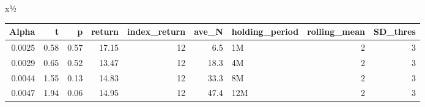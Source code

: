x½%
\begin{table}[ht]
\centering
\begin{tabular}{rrrrrrlrr}
  \hline
Alpha & t & p & return & index\_return & ave\_N & holding\_period & rolling\_mean & SD\_thres \\ 
  \hline
0.0025 & 0.58 & 0.57 & 17.15 & 12 & 6.5 & 1M &  2 &  3 \\ 
  0.0029 & 0.65 & 0.52 & 13.47 & 12 & 18.3 & 4M &  2 &  3 \\ 
  0.0044 & 1.55 & 0.13 & 14.83 & 12 & 33.3 & 8M &  2 &  3 \\ 
  0.0047 & 1.94 & 0.06 & 14.95 & 12 & 47.4 & 12M &  2 &  3 \\ 
   \hline
\end{tabular}
\end{table}

